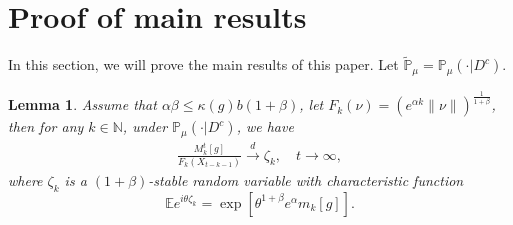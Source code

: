 \documentclass[12pt, a4paper]{amsart}
\newtheorem{lem}[thm]{Lemma}
\theoremstyle{definition}
\numberwithin{equation}{section}
\begin{document}
\section{Proof of main results}

In this section, we will prove the main results of this paper. Let $\mathbb{\tilde{P}}_{\mu}=\mathbb{P}_{\mu}(\cdot|D^c)$.
 \begin{lem}\label{lemma31}
 Assume that $\alpha\beta\leq \kappa(g)b(1+\beta)$, let $F_k(\nu)=\left(e^{\alpha k}\|\nu\|\right)^{\frac{1}{1+\beta}}$, then for any  $k\in\mathbb{N}$, under $\mathbb{P}_{\mu}(\cdot | D ^c)$, we have
 \begin{align}
      \frac{M_k^t[g]}{F_k(X_{t-k-1})}\xrightarrow{d}\zeta_k, \quad t\rightarrow \infty, \label{limitdistribution1}
 \end{align}
 where $\zeta_k$ is a $(1+\beta)$-stable random variable with characteristic function
 $$\mathbb{E}e^{i\theta\zeta_k}=\exp\left[\theta^{1+\beta}e^{\alpha}m_k[g]\right].$$
 \end{lem}
\end{document}
